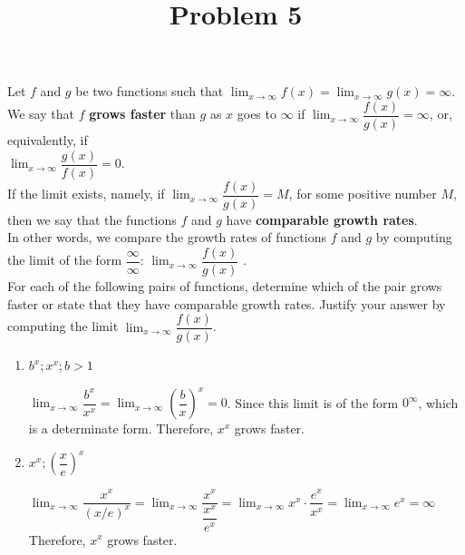 \documentclass{ximera}
\title[Problem 5]{Problem 5}
\begin{document}
\begin{abstract} \end{abstract}
\maketitle


\begin{problem}
Let $f$ and $g$ be two functions such that $\displaystyle \lim_{x\to\infty}f(x)=\displaystyle \lim_{x\to\infty}g(x)=\infty$.\\[1em]

We say that $f$   \textbf{grows faster} than $g$ as $x$ goes to $\infty$  if  $\displaystyle \lim_{x\to\infty}\dfrac{f(x)}{g(x)}=\infty$, or, equivalently, if\\

 $\displaystyle \lim_{x\to\infty}\dfrac{g(x)}{f(x)}=0$.\\

If the limit exists, namely, if  $\displaystyle \lim_{x\to\infty}\dfrac{f(x)}{g(x)}=M$, for some positive number $M$,\\

 then we say that the functions $f$ and $g$ have \textbf{comparable growth rates}.\\

In other words, we compare the growth rates of  functions $f$ and $g$ by computing the limit of the form $\dfrac{\infty}{\infty}$: $\displaystyle \lim_{x\to\infty}\dfrac{f(x)}{g(x)}$ .\\

For each of the following pairs of functions, determine which of the pair grows faster or state that they have comparable growth rates.  Justify your answer by computing the limit $\displaystyle \lim_{x\to\infty}\dfrac{f(x)}{g(x)}$.



\begin{enumerate}
	\item$b^x; x^x; b>1$
		\begin{explanation}
		$\displaystyle \lim_{x \to \infty}\dfrac{b^x}{x^x}=\displaystyle \lim_{x \to \infty}\left(\dfrac{b}{x}\right)^x=0$.  Since this limit is of the form $0^{\infty}$, which is a determinate form.
		Therefore, $x^x$ grows faster.
		
		\end{explanation}
	
	\item $x^x; \left(\dfrac{x}{e}\right)^x$
		\begin{explanation}
		$\displaystyle \lim_{x \to \infty}\dfrac{x^x}{(x/e)^x}=\displaystyle \lim_{x \to \infty}\dfrac{x^x}{\dfrac{x^x}{e^x}}=\displaystyle \lim_{x \to \infty}{x^x}\cdot{\dfrac{e^x}{x^x}}=\displaystyle \lim_{x \to \infty}{e^x}=\infty$  Therefore, $x^x$ grows faster.
		

\end{explanation}
\end{enumerate}
\end{problem}
\end{document}
